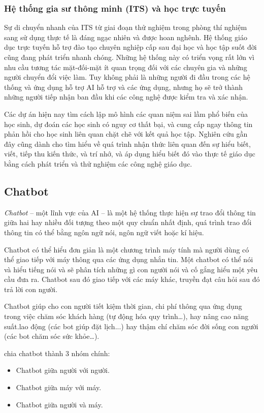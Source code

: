 \subsubsection{Hệ thống gia sư thông minh (ITS) và học trực tuyến}
Sự di chuyển nhanh của ITS từ giai đoạn thử nghiệm trong phòng thí nghiệm sang sử dụng thực tế là đáng ngạc nhiên và được hoan nghênh. Hệ thống giáo dục trực tuyến hỗ trợ đào tạo chuyên nghiệp cấp sau đại học và học tập suốt đời cũng đang phát triển nhanh chóng. Những hệ thống này có triển vọng rất lớn vì nhu cầu tương tác mặt-đối-mặt ít quan trọng đối với các chuyên gia và những người chuyển đổi việc làm. Tuy không phải là những người đi đầu trong các hệ thống và ứng dụng hỗ trợ AI hỗ trợ và các ứng dụng, nhưng họ sẽ trở thành những người tiếp nhận ban đầu khi các công nghệ được kiểm tra và xác nhận.\par
Các dự án hiện nay tìm cách lập mô hình các quan niệm sai lầm phổ biến của học sinh, dự đoán các học sinh có nguy cơ thất bại, và cung cấp ngay thông tin phản hồi cho học sinh liên quan chặt chẽ với kết quả học tập. Nghiên cứu gần đây cũng dành cho tìm hiểu về quá trình nhận thức liên quan đến sự hiểu biết, viết, tiếp thu kiến thức, và trí nhớ, và áp dụng hiểu biết đó vào thực tế giáo dục bằng cách phát triển và thử nghiệm các công nghệ giáo dục.

\subsection{Chatbot}
\textit{Chatbot} – một lĩnh vực của AI – là một hệ thống thực hiện sự trao đổi thông tin giữa hai hay nhiều đối tượng theo một quy chuẩn nhất định, quá trình trao đổi thông tin có thể bằng ngôn ngữ nói, ngôn ngữ viết hoặc kí hiệu.\par
Chatbot có thể hiểu đơn giản là một chương trình máy tính mà người dùng có thể giao tiếp với máy thông qua các ứng dụng nhắn tin. Một chatbot có thể nói và hiểu tiếng nói và sẽ phân tích những gì con người nói và cố gắng hiểu một yêu cầu đưa ra. Chatbot sau đó giao tiếp với các máy khác, truyền đạt câu hỏi sau đó trả lời con người.\par
Chatbot giúp cho con người tiết kiệm thời gian, chi phí thông qua ứng dụng trong việc chăm sóc khách hàng (tự động hóa quy trình…), hay nâng cao năng suất.lao động (các bot giúp đặt lịch...) hay thậm chí chăm sóc đời sống con người (các bot chăm sóc sức khỏe…).\par
\textcite{hoang2011ung} chia chatbot thành 3 nhóm chính:
\begin{itemize}
	\item Chatbot giữa người với người.
	\item Chatbot giữa máy với máy.
	\item Chatbot giữa người và máy.
\end{itemize}\par

